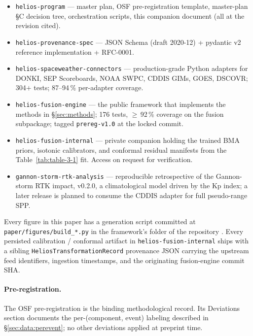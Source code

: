 \documentclass[11pt,letterpaper]{article}
\begin{document}
\begin{itemize}[leftmargin=*,itemsep=0pt]
  \item \texttt{helios-program} \cite{helios_program} ---
        master plan, OSF pre-registration template, master-plan §C decision
        tree, orchestration scripts, this companion document (all at the
        revision cited).
  \item \texttt{helios-provenance-spec} \cite{helios_provenance_spec} ---
        JSON Schema (draft 2020-12) + pydantic v2 reference implementation
        + RFC-0001.
  \item \texttt{helios-spaceweather-connectors} \cite{helios_connectors} ---
        production-grade Python adapters for DONKI, SEP Scoreboards, NOAA
        SWPC, CDDIS GIMs, GOES, DSCOVR; 304$+$ tests; 87--94\,\% per-adapter
        coverage.
  \item \texttt{helios-fusion-engine} \cite{helios_fusion_engine} ---
        the public framework that implements the methods in
        §\ref{sec:methods}; 176 tests, $\ge$\,92\,\% coverage on the
        fusion subpackage; tagged \texttt{prereg-v1.0} at the locked
        commit.
  \item \texttt{helios-fusion-internal} --- private companion holding the
        trained BMA priors, isotonic calibrators, and conformal residual
        manifests from the Table~\ref{tab:table-3-1} fit.  Access on
        request for verification.
  \item \texttt{gannon-storm-rtk-analysis} \cite{gannon_rtk} ---
        reproducible retrospective of the Gannon-storm RTK impact,
        v0.2.0, a climatological model driven by the Kp index;
        a later release is planned to consume the CDDIS adapter for
        full pseudo-range SPP.
\end{itemize}

Every figure in this paper has a generation script committed at
\texttt{paper/figures/build\_*.py} in the
framework's folder of the repository \cite{helios_fusion_engine}.  Every persisted calibration / conformal artifact in
\texttt{helios-fusion-internal} ships with a sibling
\texttt{HeliosTransformationRecord} provenance JSON
\cite{helios_provenance_spec} carrying the upstream feed identifiers,
ingestion timestamps, and the originating fusion-engine commit SHA.

\paragraph{Pre-registration.}
The OSF pre-registration \cite{osf_prereg} is the binding methodological
record.  Its Deviations section documents the per-(component, event)
labeling described in §\ref{sec:data:perevent}; no other deviations
applied at preprint time.
\end{document}
